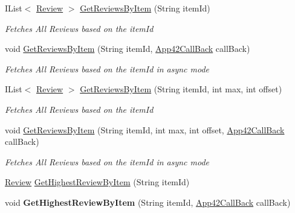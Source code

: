\begin{DoxyCompactItemize}
\item 
I\+List$<$ \hyperlink{classcom_1_1shephertz_1_1app42_1_1paas_1_1sdk_1_1csharp_1_1review_1_1_review}{Review} $>$ \hyperlink{classcom_1_1shephertz_1_1app42_1_1paas_1_1sdk_1_1csharp_1_1review_1_1_review_service_a7baa020fa3e2e872658f9f250a83414b}{Get\+Reviews\+By\+Item} (String item\+Id)
\begin{DoxyCompactList}\small\item\em Fetches All Reviews based on the item\+Id \end{DoxyCompactList}\item 
void \hyperlink{classcom_1_1shephertz_1_1app42_1_1paas_1_1sdk_1_1csharp_1_1review_1_1_review_service_ac1385a6cb547769bc4f23aacdd4b4d3a}{Get\+Reviews\+By\+Item} (String item\+Id, \hyperlink{interfacecom_1_1shephertz_1_1app42_1_1paas_1_1sdk_1_1csharp_1_1_app42_call_back}{App42\+Call\+Back} call\+Back)
\begin{DoxyCompactList}\small\item\em Fetches All Reviews based on the item\+Id in async mode \end{DoxyCompactList}\item 
I\+List$<$ \hyperlink{classcom_1_1shephertz_1_1app42_1_1paas_1_1sdk_1_1csharp_1_1review_1_1_review}{Review} $>$ \hyperlink{classcom_1_1shephertz_1_1app42_1_1paas_1_1sdk_1_1csharp_1_1review_1_1_review_service_ab864c68ad5abbaf798fa730203591f70}{Get\+Reviews\+By\+Item} (String item\+Id, int max, int offset)
\begin{DoxyCompactList}\small\item\em Fetches All Reviews based on the item\+Id \end{DoxyCompactList}\item 
void \hyperlink{classcom_1_1shephertz_1_1app42_1_1paas_1_1sdk_1_1csharp_1_1review_1_1_review_service_a80654b8445080a1f03c7a0e11a91e878}{Get\+Reviews\+By\+Item} (String item\+Id, int max, int offset, \hyperlink{interfacecom_1_1shephertz_1_1app42_1_1paas_1_1sdk_1_1csharp_1_1_app42_call_back}{App42\+Call\+Back} call\+Back)
\begin{DoxyCompactList}\small\item\em Fetches All Reviews based on the item\+Id in async mode \end{DoxyCompactList}\item 
\hyperlink{classcom_1_1shephertz_1_1app42_1_1paas_1_1sdk_1_1csharp_1_1review_1_1_review}{Review} \hyperlink{classcom_1_1shephertz_1_1app42_1_1paas_1_1sdk_1_1csharp_1_1review_1_1_review_service_a38bebabdbd5fd4f790f1254fc5544830}{Get\+Highest\+Review\+By\+Item} (String item\+Id)
\item 
\hypertarget{classcom_1_1shephertz_1_1app42_1_1paas_1_1sdk_1_1csharp_1_1review_1_1_review_service_a678d5cde01a4a345893e289c492076de}{void {\bfseries Get\+Highest\+Review\+By\+Item} (String item\+Id, \hyperlink{interfacecom_1_1shephertz_1_1app42_1_1paas_1_1sdk_1_1csharp_1_1_app42_call_back}{App42\+Call\+Back} call\+Back)}\label{classcom_1_1shephertz_1_1app42_1_1paas_1_1sdk_1_1csharp_1_1review_1_1_review_service_a678d5cde01a4a345893e289c492076de}


\end{DoxyCompactItemize}
